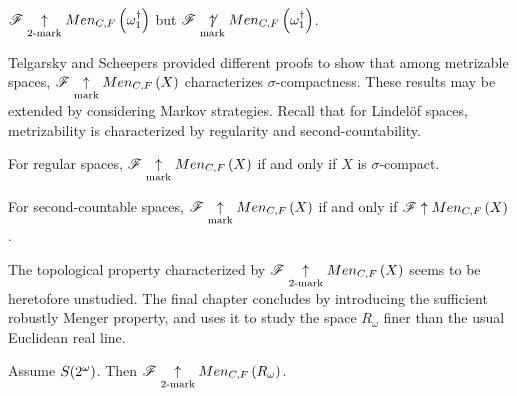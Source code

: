 \begin{thm*}
  $\mathscr{F}\underset{2\text{-mark}}{\uparrow}Men_{C,F}\left({\omega^\dagger_1}\right)$ but
  $\mathscr{F}\underset{\text{mark}}{\not\uparrow}Men_{C,F}\left({\omega^\dagger_1}\right)$.
\end{thm*}

Telgarsky \cite{MR753073} and Scheepers \cite{MR1273523} provided different
proofs to show that among metrizable spaces, $\mathscr{F}\underset{\text{mark}}{\uparrow}Men_{C,F}\left({X}\right)$
characterizes $\sigma$-compactness. These results may be extended by considering
Markov strategies. Recall that for Lindel\"of spaces, metrizability is
characterized by regularity and second-countability.

\begin{thm*}
  For regular spaces, $\mathscr{F}\underset{\text{mark}}{\uparrow}Men_{C,F}\left({X}\right)$ if and only if
  $X$ is $\sigma$-compact.
\end{thm*}

\begin{thm*}
  For second-countable spaces, $\mathscr{F}\underset{\text{mark}}{\uparrow}Men_{C,F}\left({X}\right)$ if and only if
  $\mathscr{F}\uparrow Men_{C,F}\left({X}\right)$.
\end{thm*}

The topological property characterized by $\mathscr{F}\underset{2\text{-mark}}{\uparrow}Men_{C,F}\left({X}\right)$
seems to be heretofore unstudied. The final chapter concludes by
introducing the sufficient robustly Menger property, and uses it to study the
space $R_\omega$ finer than the usual Euclidean real line.

\begin{thm*}
  Assume $S(2^\omega)$. Then $\mathscr{F}\underset{2\text{-mark}}{\uparrow}Men_{C,F}\left({R_\omega}\right)$.
\end{thm*}